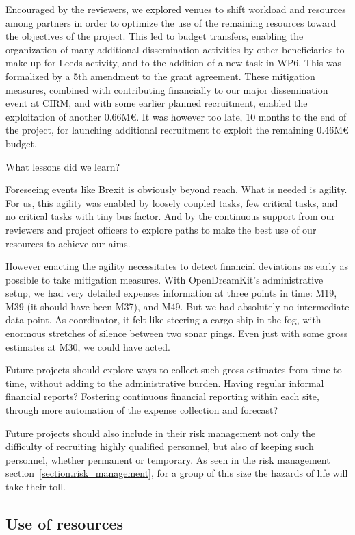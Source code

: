 Encouraged by the reviewers, we explored venues to shift workload and
resources among partners in order to optimize the use of the remaining
resources toward the objectives of the project. This led to budget
transfers, enabling the organization of many additional dissemination
activities by other beneficiaries to make up for Leeds activity, and
to the addition of a new task in WP6. This was formalized by a 5th
amendment to the grant agreement. These mitigation measures, combined
with  contributing financially to our major dissemination
event at CIRM, and with some earlier planned recruitment, enabled the
exploitation of another 0.66M€. It was however too late, 10 months to
the end of the project, for launching additional recruitment to
exploit the remaining 0.46M€ budget.

What lessons did we learn?

Foreseeing events like Brexit is obviously beyond reach. What is
needed is agility. For us, this agility was enabled by loosely coupled
tasks, few critical tasks, and no critical tasks with tiny bus factor.
And by the continuous support from our reviewers and project officers
to explore paths to make the best use of our resources to achieve our
aims.

However enacting the agility necessitates to detect financial
deviations as early as possible to take mitigation measures. With
OpenDreamKit's administrative setup, we had very detailed expenses
information at three points in time: M19, M39 (it should have been
M37), and M49. But we had absolutely no intermediate data point. As
coordinator, it felt like steering a cargo ship in the fog, with
enormous stretches of silence between two sonar pings. Even just with
some gross estimates at M30, we could have acted.

Future projects should explore ways to collect such gross estimates
from time to time, without adding to the administrative burden. Having
regular informal financial reports? Fostering continuous financial
reporting within each site, through more automation of the expense
collection and forecast?

Future projects should also include in their risk management not only
the difficulty of recruiting highly qualified personnel, but also of
keeping such personnel, whether permanent or temporary. As seen in the
risk management section~\ref{section.risk_management}, for a group of this size
the hazards of life will take their toll.

\subsection{Use of resources}

